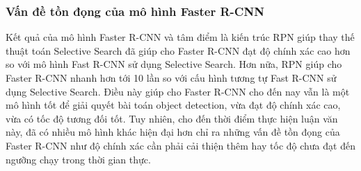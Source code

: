 {    %


    \subsubsection*{Vấn đề tồn đọng của mô hình Faster R-CNN}
    Kết quả của mô hình Faster R-CNN và tâm điểm là kiến trúc RPN giúp thay thế thuật toán Selective Search đã giúp cho Faster R-CNN đạt độ chính xác cao hơn so với mô hình Fast R-CNN sử dụng Selective Search.
    Hơn nữa, RPN giúp cho Faster R-CNN nhanh hơn tới 10 lần so với cấu hình tương tự Fast R-CNN sử dụng Selective Search.
    Điều này giúp cho Faster R-CNN cho đến nay vẫn là một mô hình tốt để giải quyết bài toán object detection, vừa đạt độ chính xác cao, vừa có tốc độ tương đối tốt.
    Tuy nhiên, cho đến thời điểm thực hiện luận văn này, đã có nhiều mô hình khác hiện đại hơn chỉ ra những vấn đề tồn đọng của Faster R-CNN như độ chính xác cần phải cải thiện thêm hay tốc độ chưa đạt đến ngưỡng chạy trong thời gian thực. 
}
